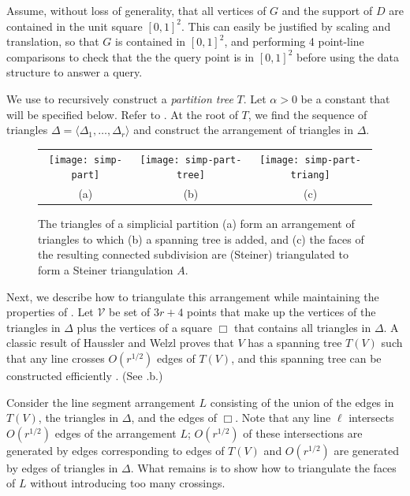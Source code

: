 \documentclass{patmorin}
\begin{document}
Assume, without loss of generality, that all vertices of $G$ and the support
of $D$ are contained in the unit square $[0,1]^2$.  This can easily be
justified by scaling and translation, so that $G$ is contained in $[0,1]^2$, and performing 4 point-line comparisons
to check that the the query point is in $[0,1]^2$ before using the data structure to answer a query.

We use  to recursively construct a \emph{partition
tree} $T$.  Let $\alpha > 0$ be a constant that will be specified below.
Refer to . At the root of $T$, we find the sequence of
triangles $\Delta=\langle\Delta_1,\ldots,\Delta_r\rangle$ and construct
the arrangement of triangles in $\Delta$.  

\begin{figure}
  \begin{center}
    \begin{tabular}{ccc}
      \texttt{[image: simp-part]} &
      \texttt{[image: simp-part-tree]} &
      \texttt{[image: simp-part-triang]} \\
      (a) & (b) & (c) \\
    \end{tabular}
  \end{center}
  \caption{The triangles of a simplicial partition (a) form an
    arrangement of triangles to which (b) a spanning tree is added, and
    (c) the faces of the resulting connected subdivision are (Steiner)
    triangulated to form a Steiner triangulation $A$.}
\end{figure}

Next, we describe how to triangulate this arrangement while maintaining
the properties of . Let $\mathcal{V}$ be set of
$3r+4$ points that make up the vertices of the triangles in $\Delta$ plus
the vertices of a square $\Box$ that contains all triangles in $\Delta$.
A classic result of Haussler and Welzl \cite{hw87} proves that $V$ has
a spanning tree $T(V)$ such that any line crosses $O(r^{1/2})$ edges of
$T(V)$, and this spanning tree can be constructed efficiently \cite{cw89}.
(See .b.)

Consider the line segment arrangement $L$ consisting of the union of
the edges in $T(V)$, the triangles in $\Delta$, and the edges of $\Box$.
Note that any line $\ell$  intersects $O(r^{1/2})$ edges of the
arrangement $L$; $O(r^{1/2})$ of these intersections are generated by
edges corresponding to edges of $T(V)$ and $O(r^{1/2})$ are generated
by edges of triangles in $\Delta$.  What remains is to show how to
triangulate the faces of $L$ without introducing too many crossings.
\end{document}
